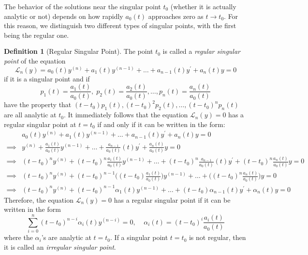 \documentclass{article}
\theoremstyle{remark}
\theoremstyle{definition}
\newtheorem{definition}{Definition}[section]
\begin{document}
The behavior of the solutions near the singular point $t_0$ (whether it is actually analytic or not) depends on how rapidly $a_0 (t)$ approaches zero as $t \rightarrow t_0$. For this reason, we distinguish two different types of singular points, with the first being the regular one. 

\begin{definition}[Regular Singular Point]
The point $t_0$ is called a \textit{regular singular point} of the equation 
\[\mathcal{L}_n (y) = a_0 (t) y^{(n)} + a_1 (t) y^{(n-1)} + \ldots + a_{n-1} (t) y^\prime + a_n (t) y = 0\]
if it is a singular point and if 
\[p_1 (t) = \frac{a_1 (t)}{a_0 (t)}, \; p_2 (t) = \frac{a_2 (t)}{a_0 (t)}, \ldots, p_n (t) = \frac{a_n (t)}{a_0 (t)}\]
have the property that $(t - t_0) p_1 (t), (t - t_0)^2 p_2 (t), \ldots, (t - t_0)^n p_n (t)$ are all analytic at $t_0$. It immediately follows that the equation $\mathcal{L}_n (y) = 0$ has a regular singular point at $t = t_0$ if and only if it can be written in the form:
\begin{align*}
    & a_0 (t) y^{(n)} + a_1 (t) y^{(n-1)} + \ldots + a_{n-1} (t) y^\prime + a_n (t) y = 0\\
    \implies & y^{(n)} + \frac{a_1 (t)}{a_0 (t)} y^{(n-1)} + \ldots + \frac{a_{n-1}}{a_0 (t)} (t) y^\prime + \frac{a_n (t)}{a_0 (t)} y = 0 \\
    \implies & (t - t_0)^n y^{(n)} + (t - t_0)^n \frac{a_1 (t)}{a_0 (t)} y^{(n-1)} + \ldots + (t - t_0)^n \frac{a_{n-1}}{a_0 (t)} (t) y^\prime + (t - t_0)^n \frac{a_n (t)}{a_0 (t)} y = 0 \\
    \implies & (t - t_0)^n y^{(n)} + (t - t_0)^{n-1} \bigg((t-t_0) \frac{a_1 (t)}{a_0 (t)}\bigg) y^{(n-1)} + \ldots + \bigg( (t-t_0)^n \frac{a_n (t)}{a_0 (t)} \bigg) y = 0 \\
    \implies & (t - t_0)^n y^{(n)} + (t - t_0)^{n-1} \alpha_1 (t) y^{(n-1)} + \ldots + (t - t_0) \alpha_{n-1} (t) y^\prime + \alpha_n (t) y = 0
\end{align*}
Therefore, the equation $\mathcal{L}_n (y) = 0$ has a regular singular point if it can be written in the form
\[\sum_{i=0}^n (t - t_0)^{n-i} \alpha_i (t) y^{(n-i)} = 0, \;\;\;\; \alpha_i (t) = (t - t_0)^i \frac{a_i (t)}{a_0 (t)}\]
where the $\alpha_i$'s are analytic at $t = t_0$. If a singular point $t = t_0$ is not regular, then it is called an \textit{irregular singular point}. 
\end{definition}
\end{document}

